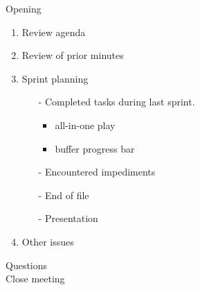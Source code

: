 \documentclass[pdftex, 12pt, a4paper]{report}
\begin{document}
\pagestyle{fancy}

Opening\\

\begin{enumerate}
\item Review agenda	\\	
\item Review of prior minutes\\
\item Sprint planning\\
\begin{enumerate}
\item[-] Completed tasks during last sprint.\\
	\begin{itemize}
	\item all-in-one play\\
	\item buffer progress bar\\
	\end{itemize}
\item[-] Encountered impediments\\
\item[-] End of file\\
\item[-] Presentation\\
\end{enumerate}
\item Other issues\\
\end{enumerate}

Questions\\

Close meeting\\
\end{document}
